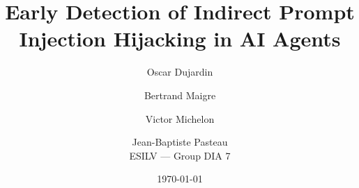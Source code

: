 \documentclass[11pt,a4paper]{article}
\title{Early Detection of Indirect Prompt Injection Hijacking in AI Agents}
\author{Oscar Dujardin \and Bertrand Maigre \and Victor Michelon \and Jean-Baptiste Pasteau\\ ESILV --- Group DIA 7}
\date{\today}
\begin{document}
\maketitle
\begin{abstract}
\end{abstract}











\end{document}
